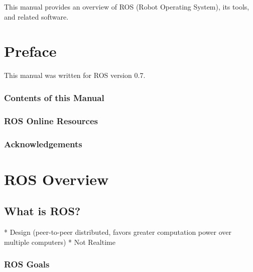 \documentclass[twoside,10pt]{article}
\newcommand{\clearemptydoublepage}{\newpage{\pagestyle{empty}\cleardoublepage}}
\begin{document}


\clearemptydoublepage
\setcounter{page}{1}

\begin{This Manual}
This manual provides an overview of ROS (Robot Operating System), its tools, and related software.
\end{This Manual}

\clearemptydoublepage
\tableofcontents

\clearemptydoublepage
{}
\setcounter{page}{1}


\section{Preface}

This manual was written for ROS version 0.7.

\subsubsection{Contents of this Manual}

\subsubsection{ROS Online Resources}

\subsubsection{Acknowledgements}



\section{ROS Overview}

\subsection{What is ROS?}

   * Design (peer-to-peer distributed, favors greater computation power over multiple computers)
   * Not Realtime

\subsubsection{ROS Goals}
\end{document}
